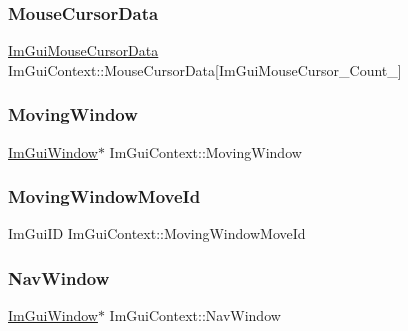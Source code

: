 \subsubsection{\texorpdfstring{Mouse\+Cursor\+Data}{MouseCursorData}}
{\footnotesize\ttfamily \hyperlink{struct_im_gui_mouse_cursor_data}{Im\+Gui\+Mouse\+Cursor\+Data} Im\+Gui\+Context\+::\+Mouse\+Cursor\+Data\mbox{[}Im\+Gui\+Mouse\+Cursor\+\_\+\+Count\+\_\+\mbox{]}}

\hypertarget{struct_im_gui_context_a28078cc22f615213fd8544016cd6ae20}{}\label{struct_im_gui_context_a28078cc22f615213fd8544016cd6ae20} 
\subsubsection{\texorpdfstring{Moving\+Window}{MovingWindow}}
{\footnotesize\ttfamily \hyperlink{struct_im_gui_window}{Im\+Gui\+Window}$\ast$ Im\+Gui\+Context\+::\+Moving\+Window}

\hypertarget{struct_im_gui_context_abfd9589ba8b4d6b78bd24d46696ed820}{}\label{struct_im_gui_context_abfd9589ba8b4d6b78bd24d46696ed820} 
\subsubsection{\texorpdfstring{Moving\+Window\+Move\+Id}{MovingWindowMoveId}}
{\footnotesize\ttfamily Im\+Gui\+ID Im\+Gui\+Context\+::\+Moving\+Window\+Move\+Id}

\hypertarget{struct_im_gui_context_ae06077e45c894488b28baaf2d7ff8e41}{}\label{struct_im_gui_context_ae06077e45c894488b28baaf2d7ff8e41} 
\subsubsection{\texorpdfstring{Nav\+Window}{NavWindow}}
{\footnotesize\ttfamily \hyperlink{struct_im_gui_window}{Im\+Gui\+Window}$\ast$ Im\+Gui\+Context\+::\+Nav\+Window}

\hypertarget{struct_im_gui_context_af6c0e07cff9641d31bdf22b7e7df2842}{}\label{struct_im_gui_context_af6c0e07cff9641d31bdf22b7e7df2842} 
